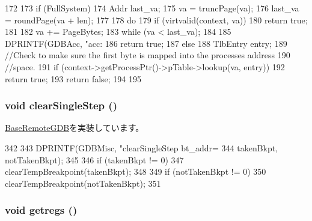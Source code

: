 \begin{DoxyCode}
172 {
173     if (FullSystem) {
174         Addr last_va;
175         va       = truncPage(va);
176         last_va  = roundPage(va + len);
177 
178         do  {
179             if (virtvalid(context, va)) {
180                 return true;
181             }
182             va += PageBytes;
183         } while (va < last_va);
184 
185         DPRINTF(GDBAcc, "acc:   %
186         return true;
187     } else {
188         TlbEntry entry;
189         //Check to make sure the first byte is mapped into the processes address
190         //space.
191         if (context->getProcessPtr()->pTable->lookup(va, entry))
192             return true;
193         return false;
194     }
195 }
\end{DoxyCode}
\hypertarget{classArmISA_1_1RemoteGDB_afd89268069d9026378b06b08c97f65f8}{
\subsubsection[{clearSingleStep}]{\setlength{\rightskip}{0pt plus 5cm}void clearSingleStep ()}}
\label{classArmISA_1_1RemoteGDB_afd89268069d9026378b06b08c97f65f8}


\hyperlink{classBaseRemoteGDB_a69f1887d1310ab6f19cf5bbcdf9d7a1e}{BaseRemoteGDB}を実装しています。


\begin{DoxyCode}
342 {
343     DPRINTF(GDBMisc, "clearSingleStep bt_addr=%
344             takenBkpt, notTakenBkpt);
345 
346     if (takenBkpt != 0)
347         clearTempBreakpoint(takenBkpt);
348 
349     if (notTakenBkpt != 0)
350         clearTempBreakpoint(notTakenBkpt);
351 }
\end{DoxyCode}
\hypertarget{classArmISA_1_1RemoteGDB_a62bc8adc5a48f1cbb5eb9bb64301d38d}{
\subsubsection[{getregs}]{\setlength{\rightskip}{0pt plus 5cm}void getregs ()}}
\label{classArmISA_1_1RemoteGDB_a62bc8adc5a48f1cbb5eb9bb64301d38d}


